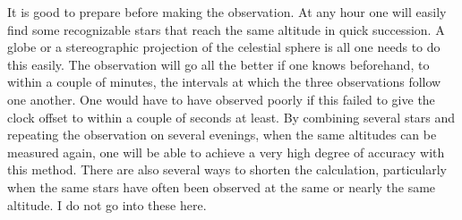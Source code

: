 It is good to prepare before making the observation. At any hour one will easily find some recognizable stars that reach the same altitude in quick succession. A globe or a stereographic projection of the celestial sphere is all one needs to do this easily. The observation will go all the better if one knows beforehand, to within a couple of minutes, the intervals at which the three observations follow one another. One would have to have observed poorly if this failed to give the clock offset to within a couple of seconds at least. By combining several stars and repeating the observation on several evenings, when the same altitudes can be measured again, one will be able to achieve a very high degree of accuracy with this method. There are also several ways to shorten the calculation, particularly when the same stars have often been observed at the same or nearly the same altitude. I do not go into these here.

